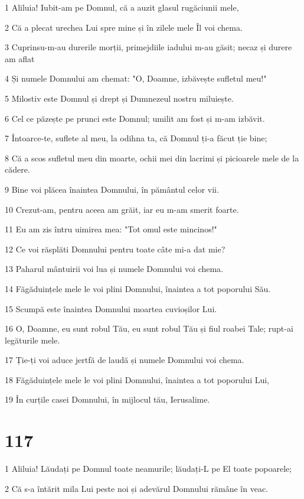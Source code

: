 \par 1 Aliluia! Iubit-am pe Domnul, că a auzit glasul rugăciunii mele,
\par 2 Că a plecat urechea Lui spre mine și în zilele mele Îl voi chema.
\par 3 Cuprinsu-m-au durerile morții, primejdiile iadului m-au găsit; necaz și durere am aflat
\par 4 Și numele Domnului am chemat: "O, Doamne, izbăvește sufletul meu!"
\par 5 Milostiv este Domnul și drept și Dumnezeul nostru miluiește.
\par 6 Cel ce păzește pe prunci este Domnul; umilit am fost și m-am izbăvit.
\par 7 Întoarce-te, suflete al meu, la odihna ta, că Domnul ți-a făcut ție bine;
\par 8 Că a scos sufletul meu din moarte, ochii mei din lacrimi și picioarele mele de la cădere.
\par 9 Bine voi plăcea înaintea Domnului, în pământul celor vii.
\par 10 Crezut-am, pentru aceea am grăit, iar eu m-am smerit foarte.
\par 11 Eu am zis întru uimirea mea: "Tot omul este mincinos!"
\par 12 Ce voi răsplăti Domnului pentru toate câte mi-a dat mie?
\par 13 Paharul mântuirii voi lua și numele Domnului voi chema.
\par 14 Făgăduințele mele le voi plini Domnului, înaintea a tot poporului Său.
\par 15 Scumpă este înaintea Domnului moartea cuvioșilor Lui.
\par 16 O, Doamne, eu sunt robul Tău, eu sunt robul Tău și fiul roabei Tale; rupt-ai legăturile mele.
\par 17 Ție-ți voi aduce jertfă de laudă și numele Domnului voi chema.
\par 18 Făgăduințele mele le voi plini Domnului, înaintea a tot poporului Lui,
\par 19 În curțile casei Domnului, în mijlocul tău, Ierusalime.

\chapter{117}

\par 1 Aliluia! Lăudați pe Domnul toate neamurile; lăudați-L pe El toate popoarele;
\par 2 Că s-a întărit mila Lui peste noi și adevărul Domnului rămâne în veac.

